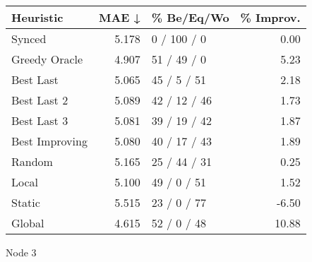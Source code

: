 \begin{tabular}{lrlr}
\toprule
\textbf{Heuristic} & \textbf{MAE ↓} & \textbf{\% Be/Eq/Wo} & \textbf{\% Improv.} \\
\midrule
            Synced &          5.178 &          0 / 100 / 0 &                0.00 \\
     Greedy Oracle &          4.907 &          51 / 49 / 0 &                5.23 \\
         Best Last &          5.065 &          45 / 5 / 51 &                2.18 \\
       Best Last 2 &          5.089 &         42 / 12 / 46 &                1.73 \\
       Best Last 3 &          5.081 &         39 / 19 / 42 &                1.87 \\
    Best Improving &          5.080 &         40 / 17 / 43 &                1.89 \\
            Random &          5.165 &         25 / 44 / 31 &                0.25 \\
             Local &          5.100 &          49 / 0 / 51 &                1.52 \\
            Static &          5.515 &          23 / 0 / 77 &               -6.50 \\
            Global &          4.615 &          52 / 0 / 48 &               10.88 \\
\bottomrule
\end{tabular}
\caption{Node 3}
\label{tab:ds_iid_lr05_le2_bs2_3}

